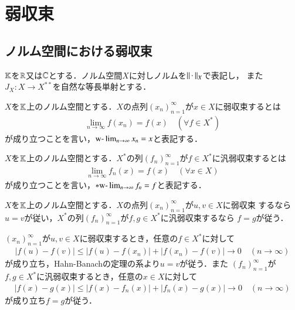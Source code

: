 \chapter{弱収束}
\section{ノルム空間における弱収束}

	$\mathbb{K}$を$\mathbb{R}$又は$\mathbb{C}$とする．ノルム空間$X$に対しノルムを$\left\|\, \cdot\, \right\|_{X}$で表記し，
	また$J_X: X \rightarrow X^{**}$を自然な等長単射とする．
	\begin{screen}
		\begin{dfn}[弱収束]
			$X$を$\mathbb{K}$上のノルム空間とする．$X$の点列$(x_n)_{n=1}^{\infty}$が$x \in X$に弱収束するとは
			\begin{align}
				\lim_{n \to \infty} f(x_n) = f(x) \quad (\forall f \in X^*)
			\end{align}
			が成り立つことを言い，$\mbox{w-}\lim_{n \to \infty} x_n = x$と表記する．
		\end{dfn}
	\end{screen}
	
	\begin{screen}
		\begin{dfn}[汎弱収束]
			$X$を$\mathbb{K}$上のノルム空間とする．$X^*$の列$(f_n)_{n=1}^{\infty}$が$f \in X^*$に汎弱収束するとは
			\begin{align}
				\lim_{n \to \infty} f_n(x) = f(x) \quad (\forall x \in X)
			\end{align}
			が成り立つことを言い，$\ast \mbox{w-}\lim_{n \to \infty} f_n = f$と表記する．
		\end{dfn}
	\end{screen}
	
	\begin{screen}
		\begin{thm}[弱収束及び汎弱収束極限の一意性]
			$X$を$\mathbb{K}$上のノルム空間とする．$X$の点列$(x_n)_{n=1}^{\infty}$が$u,v \in X$に弱収束
			するなら$u = v$が従い，$X^*$の列$(f_n)_{n=1}^{\infty}$が$f,g \in X^*$に汎弱収束するなら
			$f = g$が従う．
		\end{thm}
	\end{screen}
	
	\begin{prf}
		$(x_n)_{n=1}^{\infty}$が$u,v \in X$に弱収束するとき，任意の$f \in X^*$に対して
		\begin{align}
			\left| f(u) - f(v) \right| \leq \left| f(u) - f(x_n) \right| + \left| f(x_n) - f(v) \right| \longrightarrow 0 
			\quad (n \longrightarrow \infty)
		\end{align}
		が成り立ち，Hahn-Banachの定理の系より$u = v$が従う．また
		$(f_n)_{n=1}^{\infty}$が$f,g \in X^*$に汎弱収束するとき，任意の$x \in X$に対して
		\begin{align}
			\left| f(x) - g(x) \right| \leq \left| f(x) - f_n(x) \right| + \left| f_n(x) - g(x) \right| \longrightarrow 0 
			\quad (n \longrightarrow \infty)
		\end{align}
		が成り立ち$f = g$が従う．
		\QED
	\end{prf}
	
